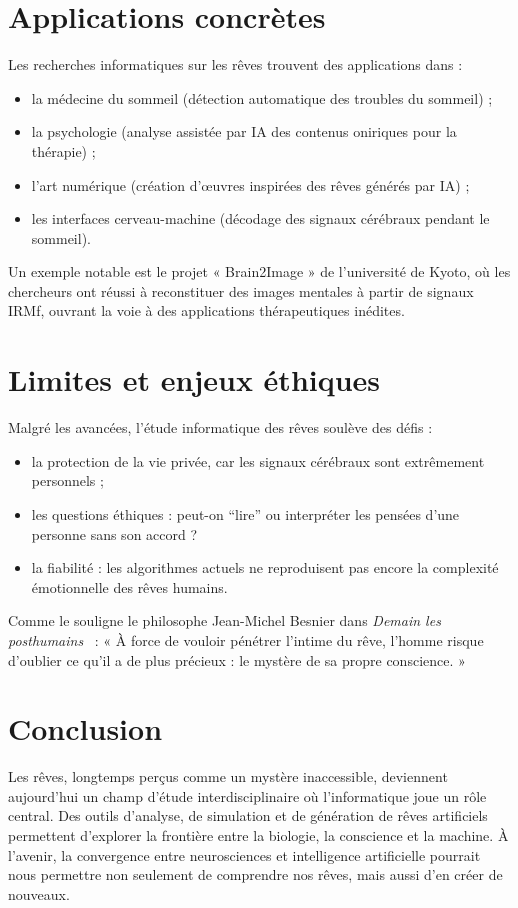 \documentclass[12pt,a4paper]{article}
\begin{document}
\section{Applications concrètes}
Les recherches informatiques sur les rêves trouvent des applications dans :
\begin{itemize}
    \item la médecine du sommeil (détection automatique des troubles du sommeil) ;
    \item la psychologie (analyse assistée par IA des contenus oniriques pour la thérapie) ;
    \item l’art numérique (création d’œuvres inspirées des rêves générés par IA) ;
    \item les interfaces cerveau-machine (décodage des signaux cérébraux pendant le sommeil).
\end{itemize}

Un exemple notable est le projet « Brain2Image » de l’université de Kyoto, où les chercheurs ont réussi à reconstituer des images mentales à partir de signaux IRMf, ouvrant la voie à des applications thérapeutiques inédites.

\section{Limites et enjeux éthiques}
Malgré les avancées, l’étude informatique des rêves soulève des défis :  
\begin{itemize}
    \item la protection de la vie privée, car les signaux cérébraux sont extrêmement personnels ;  
    \item les questions éthiques : peut-on “lire” ou interpréter les pensées d’une personne sans son accord ?  
    \item la fiabilité : les algorithmes actuels ne reproduisent pas encore la complexité émotionnelle des rêves humains.  
\end{itemize}

Comme le souligne le philosophe Jean-Michel Besnier dans \textit{Demain les posthumains}~\cite{besnier} :  
« À force de vouloir pénétrer l’intime du rêve, l’homme risque d’oublier ce qu’il a de plus précieux : le mystère de sa propre conscience. »

\section{Conclusion}
Les rêves, longtemps perçus comme un mystère inaccessible, deviennent aujourd’hui un champ d’étude interdisciplinaire où l’informatique joue un rôle central.  
Des outils d’analyse, de simulation et de génération de rêves artificiels permettent d’explorer la frontière entre la biologie, la conscience et la machine.  
À l’avenir, la convergence entre neurosciences et intelligence artificielle pourrait nous permettre non seulement de comprendre nos rêves, mais aussi d’en créer de nouveaux.

\newpage
\printbibliography
\end{document}
